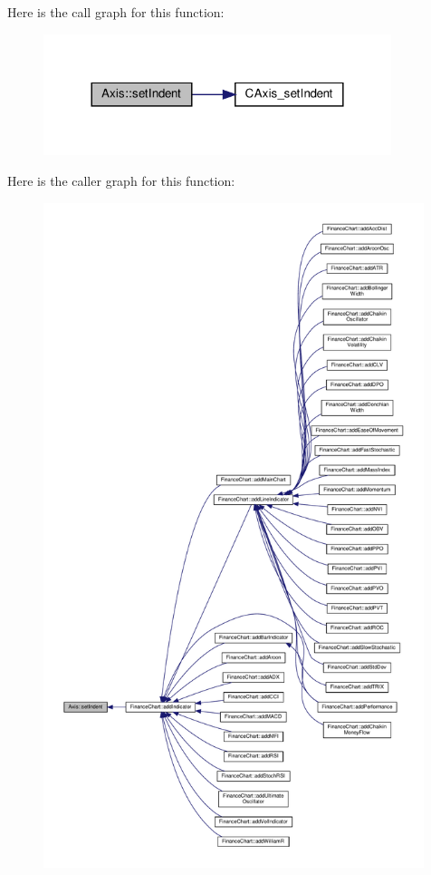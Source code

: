 Here is the call graph for this function\+:
\nopagebreak
\begin{figure}[H]
\begin{center}
\leavevmode
\includegraphics[width=288pt]{class_axis_a906b0e90dca1e327107739ed120bec67_cgraph}
\end{center}
\end{figure}
Here is the caller graph for this function\+:
\nopagebreak
\begin{figure}[H]
\begin{center}
\leavevmode
\includegraphics[height=550pt]{class_axis_a906b0e90dca1e327107739ed120bec67_icgraph}
\end{center}
\end{figure}
\mbox{\label{class_axis_af739ec5f1ef674cec9d425505451096e}} 
